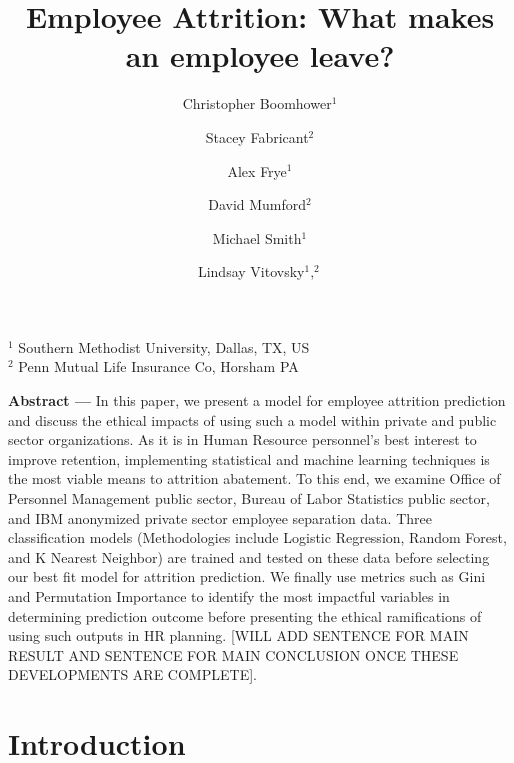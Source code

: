 \documentclass{article}
\begin{document}
\title{Employee Attrition: What makes an employee leave?}
\author{
	Christopher Boomhower$^1$
	\and
	Stacey Fabricant$^2$
	\and
	Alex Frye$^1$
	\and
	David Mumford$^2$
	\and
	Michael Smith$^1$
	\and
	Lindsay Vitovsky$^1,^2$
}
\date{}
\maketitle{}

\begin{center}
{$^1$ Southern Methodist University, Dallas, TX, US\\$^2$ Penn Mutual Life Insurance Co, Horsham PA}
\end{center}

\renewenvironment{abstract}
               {\list{}{\rightmargin\leftmargin}%
                \item[\textbf{\hspace{10mm}Abstract ---}]\relax}
               {\endlist}



\begin{abstract}\noindent In this paper, we present a model for employee attrition prediction and discuss the ethical impacts of using such a model within private and public sector organizations. As it is in Human Resource personnel’s best interest to improve retention, implementing statistical and machine learning techniques is the most viable means to attrition abatement. To this end, we examine Office of Personnel Management public sector, Bureau of Labor Statistics public sector, and IBM anonymized private sector employee separation data. Three classification models (Methodologies include Logistic Regression, Random Forest, and K Nearest Neighbor) are trained and tested on these data before selecting our best fit model for attrition prediction. We finally use metrics such as Gini and Permutation Importance to identify the most impactful variables in determining prediction outcome before presenting the ethical ramifications of using such outputs in HR planning. [WILL ADD SENTENCE FOR MAIN RESULT AND SENTENCE FOR MAIN CONCLUSION ONCE THESE DEVELOPMENTS ARE COMPLETE].\end{abstract}

 
\section{Introduction}
\end{document}
